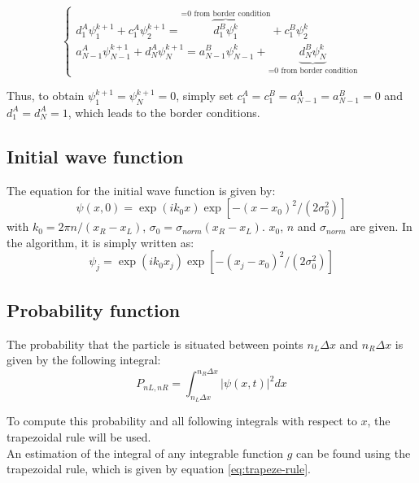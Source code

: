 \documentclass[a4paper,12pt,twoside]{article}
\begin{document}
      \begin{equation}
        \begin{cases}
          d_1^A\psi_1^{k+1} +c_1^A\psi_2^{k+1} = \overbrace{d_1^B\psi_1^k}^\text{=0 from border condition} + c_1^B\psi_2^k\\
          a_{N-1}^A\psi_{N-1}^{k+1} + d_N^A\psi_N^{k+1} = a_{N-1}^B\psi_{N-1}^k + \underbrace{d_N^B\psi_N^k}_\text{=0 from border condition}
        \end{cases}
        \label{eq:border_cond_eq}
      \end{equation}

      Thus, to obtain $\psi_1^{k+1} = \psi_N^{k+1} = 0$, simply set $c_1^A = c_1^B = a_{N-1}^A = a_{N-1}^B = 0$ and $d_1^A = d_N^A = 1$, which leads to the border conditions.

  \subsection{Initial wave function}
    The equation for the initial wave function is given by:
    \begin{equation}
     \psi(x,0)=\exp(ik_0x)\exp\left[-(x-x_0)^2/(2\sigma_0^2)\right]
     \label{eq:psiinit}
    \end{equation}
    with $k_0=2\pi n/(x_R-x_L)$, $\sigma_0=\sigma_{norm}(x_R-x_L)$. $x_0$, $n$ and $\sigma_{norm}$ are given. In the algorithm, it is simply written as:
    \begin{equation}
     \psi_j=\exp(ik_0x_j)\exp\left[-(x_j-x_0)^2/(2\sigma_0^2)\right]
     \label{eq:psiinitdis}
    \end{equation}

  \subsection{Probability function}
    The probability that the particle is situated between points $n_L\Delta x$ and $n_R\Delta x$ is given by the following integral:
    \begin{equation}
     P_{nL,nR} = \int_{n_L\Delta x}^{n_R\Delta x} |\psi(x,t)|^2 dx
    \end{equation}

    To compute this probability and all following integrals with respect to $x$, the trapezoidal rule will be used.\\
    An estimation of the integral of any integrable function $g$ can be found using the trapezoidal rule, which is given by equation \eqref{eq:trapeze-rule}.
\end{document}
